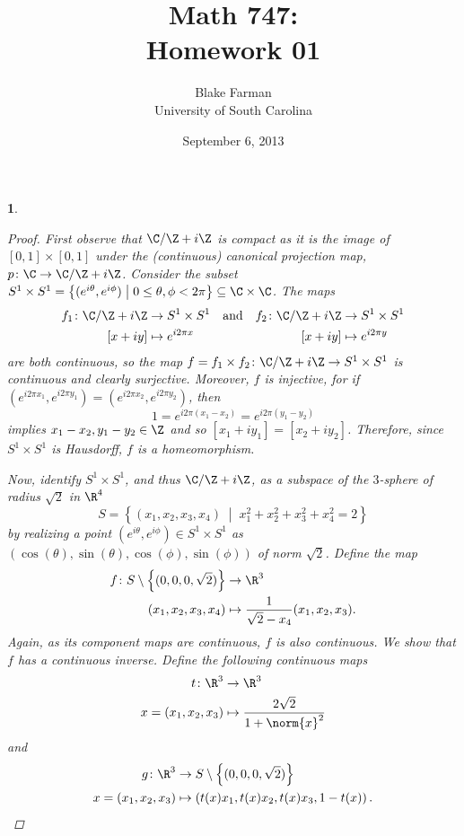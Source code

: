 \documentclass[10pt]{amsart}
\author{Blake Farman\\University of South Carolina}
\title{Math 747:\\Homework 01}
\date{September 6, 2013}
\begin{document}
\maketitle

\providecommand{\p}{\mathfrak{p}}
\providecommand{\m}{\mathfrak{m}}

\newtheorem{thm}{}
\newtheorem{lem}{Lemma}

\begin{thm}\label{ex1}

	\begin{proof}
		First observe that $\C / \Z + i\Z$ is compact as it is the image of $[0,1] \times [0,1]$ under the (continuous) canonical projection map, $p \colon \C \rightarrow \C/\Z + i\Z$.
		Consider the subset $S^1 \times S^1 = \left\{(e^{i\theta}, e^{i\phi}) \;\middle\vert\; 0 \leq \theta, \phi < 2\pi \right\} \subseteq \C \times \C$.
		The maps
		\begin{align*}
			f_1 \colon \C / \Z + i\Z &\rightarrow S^1 \times S^1 &\text{and}&& f_2 \colon \C / \Z + i\Z & \rightarrow S^1 \times S^1\\
			[x + iy] & \mapsto e^{i2\pi x} &&& [x + iy] & \mapsto e^{i2\pi y}
		\end{align*}
		are both continuous, so the map $f = f_1 \times f_2 \colon \C / \Z + i\Z \rightarrow S^1 \times S^1$ is continuous and clearly surjective.
		Moreover, $f$ is injective, for if $(e^{i2\pi x_1}, e^{i2\pi y_1}) = (e^{i2\pi x_2}, e^{i2\pi y_2})$, then
		$$1 = e^{i2\pi(x_1 - x_2)} = e^{i2\pi(y_1 - y_2)}$$
		implies $x_1 - x_2, y_1 - y_2 \in \Z$ and so $[x_1 + iy_1] = [x_2 + iy_2]$.
		Therefore, since $S^1 \times S^1$ is Hausdorff, $f$ is a homeomorphism.

		Now, identify $S^1 \times S^1$, and thus $\C/\Z + i\Z$, as a subspace of the $3$-sphere of radius $\sqrt{2}$ in $\R^4$
		$$S = \left\{(x_1, x_2, x_3, x_4) \;\middle\vert\; x_1^2 + x_2^2 + x_3^2 + x_4^2 = 2\right\}$$
		by realizing a point $(e^{i\theta}, e^{i\phi}) \in S^1 \times S^1$ as $(\cos(\theta), \sin(\theta), \cos(\phi), \sin(\phi))$ of norm $\sqrt{2}$.
		Define the map
		\begin{align*}
			f  \colon S \setminus \left\{ (0,0,0,\sqrt{2}) \right\} &\rightarrow \R^3\\
			(x_1, x_2, x_3, x_4) &\mapsto \frac{1}{\sqrt{2} - x_4}(x_1, x_2, x_3).
		\end{align*}
		Again, as its component maps are continuous, $f$ is also continuous.
		We show that $f$ has a continuous inverse.
		Define the following continuous maps
		\begin{align*}
			t \colon \R^3 &\rightarrow \R^3\\
			x = (x_1, x_2, x_3) &\mapsto \frac{2\sqrt{2}}{1 + \norm{x}^2}
		\end{align*}
		and
		\begin{align*}
			g \colon \R^3 &\rightarrow S \setminus \left\{ (0,0,0,\sqrt{2}) \right\}\\
			x = (x_1, x_2, x_3) &\mapsto \left(t(x)x_1, t(x)x_2, t(x)x_3, 1 - t(x)\right).
		\end{align*}
		

\end{proof}
\end{thm}
\end{document}
